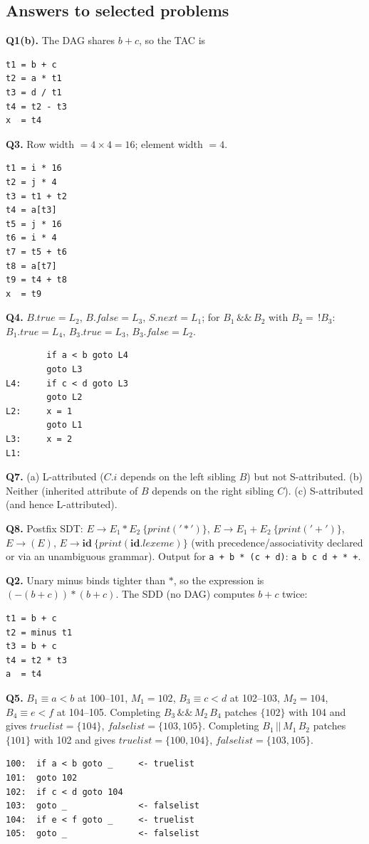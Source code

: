 \documentclass[11pt,a4paper]{article}
\newcommand{\at}[2]{\ensuremath{#1.\mathit{#2}}}
\newcommand{\tok}[1]{\ensuremath{\mathtt{#1}}}
\begin{document}
\subsection*{Answers to selected problems}
\textbf{Q1(b).} The DAG shares $b+c$, so the TAC is
\begin{lstlisting}
t1 = b + c
t2 = a * t1
t3 = d / t1
t4 = t2 - t3
x  = t4
\end{lstlisting}

\textbf{Q3.} Row width $=4\times4=16$; element width $=4$.
\begin{lstlisting}
t1 = i * 16
t2 = j * 4
t3 = t1 + t2
t4 = a[t3]
t5 = j * 16
t6 = i * 4
t7 = t5 + t6
t8 = a[t7]
t9 = t4 + t8
x  = t9
\end{lstlisting}

\textbf{Q4.} \at{B}{true}$=L_2$, \at{B}{false}$=L_3$, \at{S}{next}$=L_1$; for $B_1\,\&\&\,B_2$ with $B_2=\,!B_3$: $B_1.\mathit{true}=L_4$, $B_3.\mathit{true}=L_3$, $B_3.\mathit{false}=L_2$.
\begin{lstlisting}
        if a < b goto L4
        goto L3
L4:     if c < d goto L3
        goto L2
L2:     x = 1
        goto L1
L3:     x = 2
L1:
\end{lstlisting}

\textbf{Q7.} (a) L-attributed ($C.i$ depends on the left sibling $B$) but not S-attributed. (b) Neither (inherited attribute of $B$ depends on the right sibling $C$). (c) S-attributed (and hence L-attributed).

\textbf{Q8.} Postfix SDT: $E \to E_1 * E_2\ \{\mathit{print}(\tok{'*'})\}$, $E \to E_1 + E_2\ \{\mathit{print}(\tok{'+'})\}$, $E \to (E)$, $E \to \mathbf{id}\ \{\mathit{print}(\at{\mathbf{id}}{lexeme})\}$ (with precedence/associativity declared or via an unambiguous grammar). Output for \texttt{a + b * (c + d)}: \texttt{a b c d + * +}.

\textbf{Q2.} Unary minus binds tighter than $*$, so the expression is $(-(b+c))*(b+c)$. The SDD (no DAG) computes $b+c$ twice:
\begin{lstlisting}
t1 = b + c
t2 = minus t1
t3 = b + c
t4 = t2 * t3
a  = t4
\end{lstlisting}

\textbf{Q5.} $B_1\equiv a<b$ at 100--101, $M_1=102$, $B_3\equiv c<d$ at 102--103, $M_2=104$, $B_4\equiv e<f$ at 104--105. Completing $B_3\,\&\&\,M_2\,B_4$ patches $\{102\}$ with 104 and gives $\mathit{truelist}=\{104\}$, $\mathit{falselist}=\{103,105\}$. Completing $B_1\,||\,M_1\,B_2$ patches $\{101\}$ with 102 and gives $\mathit{truelist}=\{100,104\}$, $\mathit{falselist}=\{103,105\}$.
\begin{lstlisting}
100:  if a < b goto _     <- truelist
101:  goto 102
102:  if c < d goto 104
103:  goto _              <- falselist
104:  if e < f goto _     <- truelist
105:  goto _              <- falselist
\end{lstlisting}
\end{document}
